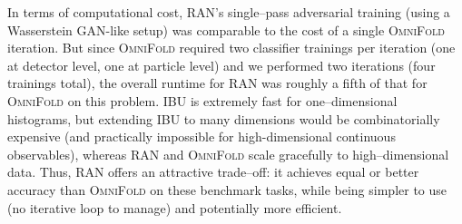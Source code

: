 {{            %
            In terms of computational cost, RAN’s single--pass adversarial training (using a Wasserstein GAN-like setup) was comparable to the cost of a single \textsc{OmniFold} iteration.
            But since \textsc{OmniFold} required two classifier trainings per iteration (one at detector level, one at particle level) and we performed two iterations (four trainings total), the overall runtime for RAN was roughly a fifth of that for \textsc{OmniFold} on this problem.
            IBU is extremely fast for one--dimensional histograms, but extending IBU to many dimensions would be combinatorially expensive (and practically impossible for high-dimensional continuous observables), whereas RAN and \textsc{OmniFold} scale gracefully to high--dimensional data.
            Thus, RAN offers an attractive trade--off: it achieves equal or better accuracy than \textsc{OmniFold} on these benchmark tasks, while being simpler to use (no iterative loop to manage) and potentially more efficient.

}}
